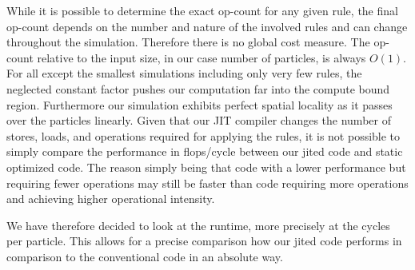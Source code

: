 While it is possible to determine the exact op-count for any given rule, the final op-count depends on the number and nature of the involved rules and can change throughout the simulation.
Therefore there is no global cost measure.
The op-count relative to the input size, in our case number of particles, is always $O(1)$. 
For all except the smallest simulations including only very few rules, the neglected constant factor pushes our computation far into the compute bound region. 
Furthermore our simulation exhibits perfect spatial locality as it passes over the particles linearly.
Given that our JIT compiler changes the number of stores, loads, and operations required for applying the rules, it is not possible to simply compare the performance in flops/cycle between our jited code and static optimized code.
The reason simply being that code with a lower performance but requiring fewer operations may still be faster than code requiring more operations and achieving higher operational intensity.

We have therefore decided to look at the runtime, more precisely at the cycles per particle. This allows for a precise comparison how our jited code performs in comparison to the conventional code in an absolute way.
